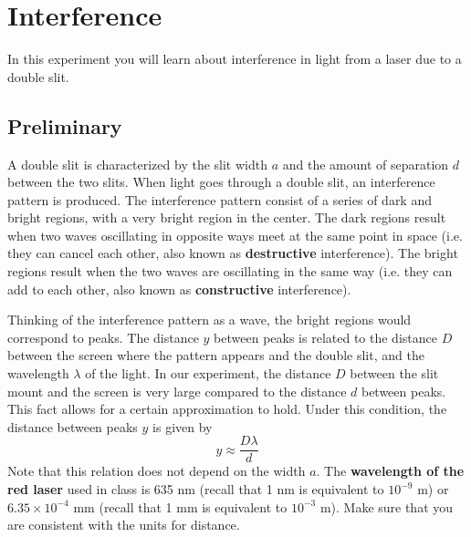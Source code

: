 \setcounter{chapter}{9}
\chapter{Interference}
In this experiment you will learn about interference in light from a laser due to a double slit.
\section{Preliminary}
A double slit is characterized by the slit width $a$ and the amount of separation $d$ between the two slits. When light goes through a double slit, an interference pattern is produced. The interference pattern consist of a series of dark and bright regions, with a very bright region in the center. The dark regions result when two waves oscillating in opposite ways meet at the same point in space (i.e. they can cancel each other, also known as \textbf{destructive} interference). The bright regions result when the two waves are oscillating in the same way (i.e. they can add to each other, also known as \textbf{constructive} interference).

Thinking of the interference pattern as a wave, the bright regions would correspond to peaks. The distance $y$ between peaks is related to the distance $D$ between the screen where the pattern appears and the double slit, and the wavelength $\lambda$ of the light. In our experiment, the distance $D$ between the slit mount and the screen is very large compared to the distance $d$ between peaks. This fact allows for a certain approximation to hold. Under this condition, the distance between peaks $y$ is given by
\begin{equation} \label{y.eq}
	y \approx \frac{D \lambda}{d}
\end{equation}
Note that this relation does not depend on the width $a$. The \textbf{wavelength of the red laser} used in class is 635 nm (recall that 1 nm is equivalent to $10^{-9}$ m) or $6.35 \times 10^{-4}$ mm (recall that 1 mm is equivalent to $10^{-3}$ m). Make sure that you are consistent with the units for distance.
